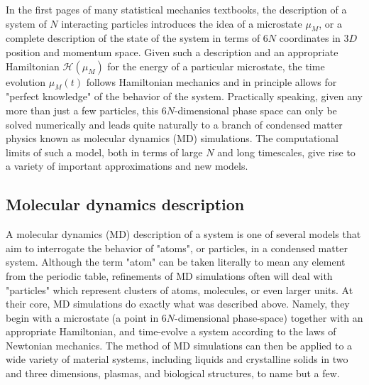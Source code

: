 In the first pages of many statistical mechanics textbooks, the description of a system of $N$ interacting particles introduces the idea of a microstate $\mu_M$, or a complete description of the state of the system in terms of $6N$ coordinates in $3D$ position and momentum space.  Given such a description and an appropriate Hamiltonian $\mathcal{H}(\mu_M)$ for the energy of a particular microstate, the time evolution $\mu_M(t)$ follows Hamiltonian mechanics and in principle allows for "perfect knowledge" of the behavior of the system.  Practically speaking, given any more than just a few particles, this $6N$-dimensional phase space can only be solved numerically and leads quite naturally to a branch of condensed matter physics known as molecular dynamics (MD) simulations.  The computational limits of such a model, both in terms of large $N$ and long timescales, give rise to a variety of important approximations and new models.

\subsection{Molecular dynamics description}

A molecular dynamics (MD) description of a system is one of several models that aim to interrogate the behavior of "atoms", or particles, in a condensed matter system.  Although the term "atom" can be taken literally to mean any element from the periodic table, refinements of MD simulations often will deal with "particles" which represent clusters of atoms, molecules, or even larger units.  At their core, MD simulations do exactly what was described above.  Namely, they begin with a microstate (a point in $6N$-dimensional phase-space) together with an appropriate Hamiltonian, and time-evolve a system according to the laws of Newtonian mechanics.  The method of MD simulations can then be applied to a wide variety of material systems, including liquids and crystalline solids in two and three dimensions, plasmas, and biological structures, to name but a few.

